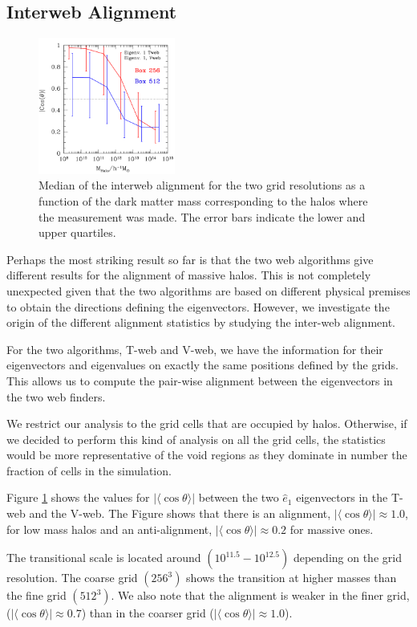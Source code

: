\documentclass[useAMS,usenatbib]{mn2e}
\newcommand{\hMsun}{{\ifmmode{h^{-1}{\rm
        {M_{\odot}}}}\else{$h^{-1}{\rm{M_{\odot}}}$~}\fi}}
\newcommand{\muavg}{\vert\langle\cos\theta\rangle\vert}
\begin{document}
\subsection{Interweb Alignment}

\begin{figure}
\includegraphics[width=0.40\textwidth]{Fig5.pdf}
\caption{Median of the interweb alignment for the two grid
  resolutions as a function of the dark matter mass corresponding to
  the halos where the measurement was made. The error bars indicate
  the lower and upper quartiles.
\label{fig:interweb}}
\end{figure}

Perhaps the most striking result so far is that the two web algorithms give
different results for the alignment of massive halos. This is not
completely unexpected given that the two algorithms are based on
different physical premises to obtain the directions defining the
eigenvectors. However, we investigate the origin of the different
alignment statistics by studying the inter-web alignment.
 
For the two algorithms, T-web and V-web, we have the information for their
eigenvectors and eigenvalues on exactly the same positions defined
by the grids. This allows us to compute the pair-wise alignment
between the eigenvectors in the two web finders.

We restrict our analysis to the grid cells that are occupied by
halos. Otherwise, if we decided to perform this kind of analysis on
all the grid cells, the statistics would be more representative of the void
regions as they dominate in number the fraction of cells in the
simulation.

Figure \ref{fig:interweb} shows the values for $\muavg$ between the
two $\hat{e}_1$ eigenvectors in the T-web and the V-web.  The Figure
shows that there is an alignment, $\muavg\approx 1.0$, for low mass
halos and an anti-alignment, $\muavg\approx 0.2$ for massive ones.

The transitional scale is located around $(10^{11.5}-10^{12.5})$\hMsun
depending on the grid resolution. The coarse grid $(256^3)$ shows the
transition at higher masses than the fine grid $(512^3)$.   We also
note that the alignment is weaker in the finer grid, ($\muavg\approx
0.7$) than in the coarser grid ($\muavg\approx1.0$). 
\end{document}
